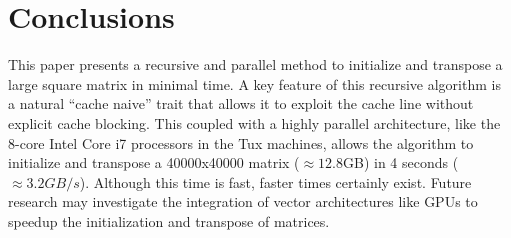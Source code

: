 \documentclass[conference]{IEEEtran}
\begin{document}
\section{Conclusions}\label{conclusions}

This paper presents a recursive and parallel method to initialize and
transpose a large square matrix in minimal time. A key feature of this
recursive algorithm is a natural ``cache naive'' trait that allows it to
exploit the cache line without explicit cache blocking. This coupled
with a highly parallel architecture, like the 8-core Intel Core i7
processors in the Tux machines, allows the algorithm to initialize and
transpose a 40000x40000 matrix (\(\approx 12.8\)GB) in 4 seconds
(\(\approx 3.2GB/s\)). Although this time is fast, faster times
certainly exist. Future research may investigate the integration of
vector architectures like GPUs to speedup the initialization and
transpose of matrices.
\end{document}
